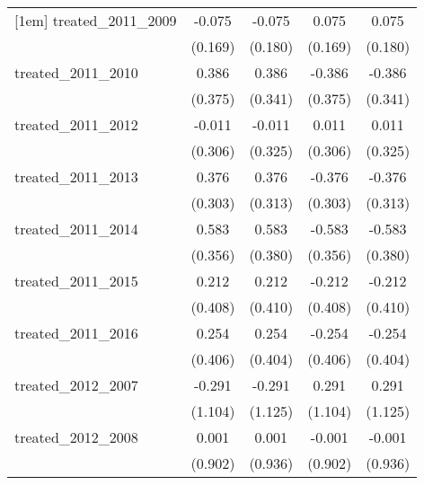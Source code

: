 {\begin{tabular}{l*{4}{c}}
[1em]
treated\_2011\_2009&      -0.075         &      -0.075         &       0.075         &       0.075         \\
            &     (0.169)         &     (0.180)         &     (0.169)         &     (0.180)         \\
[1em]
treated\_2011\_2010&       0.386         &       0.386         &      -0.386         &      -0.386         \\
            &     (0.375)         &     (0.341)         &     (0.375)         &     (0.341)         \\
[1em]
treated\_2011\_2012&      -0.011         &      -0.011         &       0.011         &       0.011         \\
            &     (0.306)         &     (0.325)         &     (0.306)         &     (0.325)         \\
[1em]
treated\_2011\_2013&       0.376         &       0.376         &      -0.376         &      -0.376         \\
            &     (0.303)         &     (0.313)         &     (0.303)         &     (0.313)         \\
[1em]
treated\_2011\_2014&       0.583         &       0.583         &      -0.583         &      -0.583         \\
            &     (0.356)         &     (0.380)         &     (0.356)         &     (0.380)         \\
[1em]
treated\_2011\_2015&       0.212         &       0.212         &      -0.212         &      -0.212         \\
            &     (0.408)         &     (0.410)         &     (0.408)         &     (0.410)         \\
[1em]
treated\_2011\_2016&       0.254         &       0.254         &      -0.254         &      -0.254         \\
            &     (0.406)         &     (0.404)         &     (0.406)         &     (0.404)         \\
[1em]
treated\_2012\_2007&      -0.291         &      -0.291         &       0.291         &       0.291         \\
            &     (1.104)         &     (1.125)         &     (1.104)         &     (1.125)         \\
[1em]
treated\_2012\_2008&       0.001         &       0.001         &      -0.001         &      -0.001         \\
            &     (0.902)         &     (0.936)         &     (0.902)         &     (0.936)         \\

\end{tabular}}
